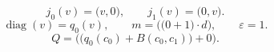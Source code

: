 \[j_0(v)=\bigl(v,0\bigr),\qquad j_1(v)=\bigl(0,v\bigr).\]
\[\operatorname{diag}(v)=q_0(v),\qquad m=\bigl(\bigl(0+1\bigr)\cdot d\bigr),\qquad \varepsilon=1.\]
\[Q=\bigl(\bigl(q_0(c_0)+B(c_0,c_1)\bigr)+0\bigr).\]
